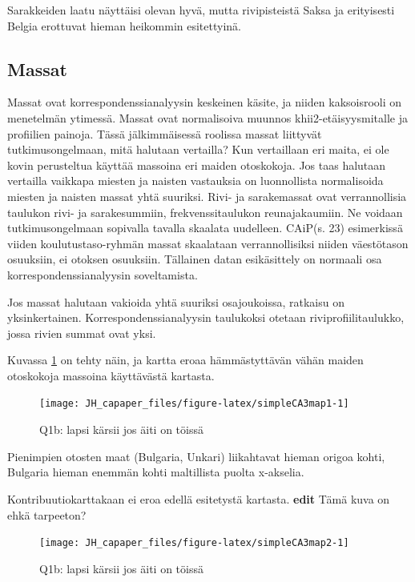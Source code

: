 \documentclass[
  finnish,
]{book}
\begin{document}
Sarakkeiden laatu näyttäisi olevan hyvä, mutta rivipisteistä Saksa ja erityisesti
Belgia erottuvat hieman heikommin esitettyinä.

\hypertarget{massat}{%
\subsection{Massat}\label{massat}}

Massat ovat korrespondenssianalyysin keskeinen käsite, ja niiden kaksoisrooli on
menetelmän ytimessä. Massat ovat normalisoiva muunnos khii2-etäisyysmitalle ja
profiilien painoja. Tässä jälkimmäisessä roolissa massat liittyvät tutkimusongelmaan,
mitä halutaan vertailla? Kun vertaillaan eri maita, ei ole kovin perusteltua käyttää
massoina eri maiden otoskokoja. Jos taas halutaan vertailla vaikkapa miesten ja
naisten vastauksia on luonnollista normalisoida miesten ja naisten massat yhtä
suuriksi. Rivi- ja sarakemassat ovat verrannollisia taulukon rivi- ja sarakesummiin,
frekvenssitaulukon reunajakaumiin. Ne voidaan tutkimusongelmaan sopivalla tavalla
skaalata uudelleen. CAiP(s. 23) esimerkissä viiden koulutustaso-ryhmän massat skaalataan
verrannollisiksi niiden väestötason osuuksiin, ei otoksen osuuksiin. Tällainen datan
esikäsittely on normaali osa korrespondenssianalyysin soveltamista.

Jos massat halutaan vakioida yhtä suuriksi osajoukoissa, ratkaisu on yksinkertainen.
Korrespondenssianalyysin taulukoksi otetaan riviprofiilitaulukko, jossa rivien summat
ovat yksi.

Kuvassa \ref{fig:simpleCA3map1} on tehty näin, ja kartta eroaa hämmästyttävän
vähän maiden otoskokoja massoina käyttävästä kartasta.

\begin{figure}

{\centering \texttt{[image: JH\_capaper\_files/figure-latex/simpleCA3map1-1]} 

}

\caption{Q1b: lapsi kärsii jos äiti on töissä}\label{fig:simpleCA3map1}
\end{figure}

Pienimpien otosten maat (Bulgaria, Unkari) liikahtavat hieman origoa kohti,
Bulgaria hieman enemmän kohti maltillista puolta x-akselia.

Kontribuutiokarttakaan ei eroa edellä esitetystä kartasta.
\textbf{edit} Tämä kuva on ehkä tarpeeton?

\begin{figure}

{\centering \texttt{[image: JH\_capaper\_files/figure-latex/simpleCA3map2-1]} 

}

\caption{Q1b: lapsi kärsii jos äiti on töissä}\label{fig:simpleCA3map2}
\end{figure}
\end{document}
